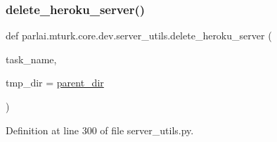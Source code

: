 \mbox{\label{namespaceparlai_1_1mturk_1_1core_1_1dev_1_1server__utils_a876e990f1f5e670ff9c89869bdd1f1f6}} 
\subsubsection{\texorpdfstring{delete\+\_\+heroku\+\_\+server()}{delete\_heroku\_server()}}
{\footnotesize\ttfamily def parlai.\+mturk.\+core.\+dev.\+server\+\_\+utils.\+delete\+\_\+heroku\+\_\+server (\begin{DoxyParamCaption}\item[{}]{task\+\_\+name,  }\item[{}]{tmp\+\_\+dir = {\ttfamily \hyperlink{namespaceparlai_1_1mturk_1_1core_1_1dev_1_1server__utils_a432ae14c0d872fbfebe4d9b7d73d13b9}{parent\+\_\+dir}} }\end{DoxyParamCaption})}



Definition at line 300 of file server\+\_\+utils.\+py.


